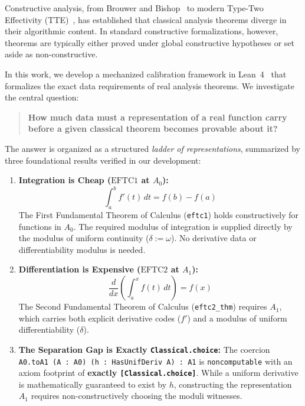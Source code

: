 \documentclass[11pt,a4paper]{article}
\theoremstyle{definition}
\theoremstyle{remark}
\begin{document}
Constructive analysis, from Brouwer and Bishop~\cite{bishop1967,bishop1985} to modern Type-Two Effectivity (TTE)~\cite{weihrauch2000}, has established that classical analysis theorems diverge in their algorithmic content. In standard constructive formalizations, however, theorems are typically either proved under global constructive hypotheses or set aside as non-constructive.

In this work, we develop a mechanized calibration framework in Lean~4~\cite{demoura2021} that formalizes the exact data requirements of real analysis theorems. We investigate the central question:
\begin{quote}
\centering
\textbf{How much data must a representation of a real function carry before a given classical theorem becomes provable about it?}
\end{quote}

The answer is organized as a structured \emph{ladder of representations}, summarized by three foundational results verified in our development:
\begin{enumerate}
    \item \textbf{Integration is Cheap ($\text{EFTC1}$ at $A_0$):}
    \[
    \int_a^b f'(t) \, dt = f(b) - f(a)
    \]
    The First Fundamental Theorem of Calculus (\texttt{eftc1}) holds constructively for functions in $A_0$. The required modulus of integration is supplied directly by the modulus of uniform continuity ($\delta := \omega$). No derivative data or differentiability modulus is needed.
    \item \textbf{Differentiation is Expensive ($\text{EFTC2}$ at $A_1$):}
    \[
    \frac{d}{dx} \left( \int_a^x f(t) \, dt \right) = f(x)
    \]
    The Second Fundamental Theorem of Calculus (\texttt{eftc2\_thm}) requires $A_1$, which carries both explicit derivative codes ($f'$) and a modulus of uniform differentiability ($\delta$).
    \item \textbf{The Separation Gap is Exactly \texttt{Classical.choice}:}
    The coercion \texttt{A0.toA1 (A : A0) (h : HasUnifDeriv A) : A1} is \texttt{noncomputable} with an axiom footprint of \textbf{exactly \texttt{[Classical.choice]}}. While a uniform derivative is mathematically guaranteed to exist by $h$, constructing the representation $A_1$ requires non-constructively choosing the moduli witnesses.
\end{enumerate}
\end{document}
